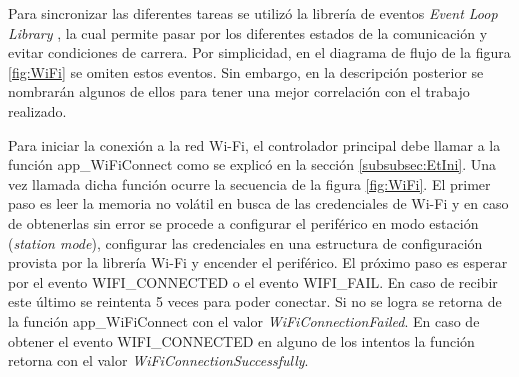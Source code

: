 Para sincronizar las diferentes tareas se utilizó la librería de eventos \textit{Event Loop Library} \citep{EVENT}, la cual permite pasar por los diferentes estados de la comunicación y evitar condiciones de carrera. Por simplicidad, en el diagrama de flujo de la figura \ref{fig:WiFi} se omiten estos eventos. Sin embargo, en la descripción posterior se nombrarán algunos de ellos para tener una mejor correlación con el trabajo realizado.

Para iniciar la conexión a la red Wi-Fi, el controlador principal debe llamar a la función app\_WiFiConnect como se explicó en la sección \ref{subsubsec:EtIni}. Una vez llamada dicha función ocurre la secuencia de la figura \ref{fig:WiFi}. El primer paso es leer la memoria no volátil en busca de las credenciales de Wi-Fi y en caso de obtenerlas sin error se procede a configurar el periférico en modo estación (\textit{station mode}), configurar las credenciales en una estructura de configuración provista por la librería Wi-Fi y encender el periférico. El próximo paso es esperar por el evento WIFI\_CONNECTED o el evento WIFI\_FAIL. En caso de recibir este último se reintenta 5 veces para poder conectar. Si no se logra se retorna de la función app\_WiFiConnect con el valor \textit{WiFiConnectionFailed}. En caso de obtener el evento  WIFI\_CONNECTED en alguno de los intentos la función retorna con el valor \textit{WiFiConnectionSuccessfully}.

\pagebreak

